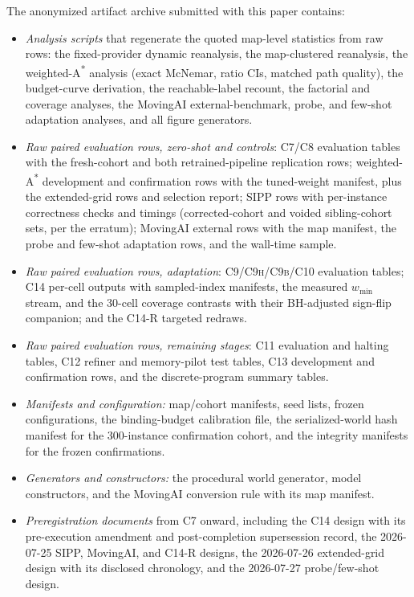 \documentclass[letterpaper]{article} %
\newcommand{\stage}[1]{\textsc{#1}}
\begin{document}
The anonymized artifact archive submitted with this paper contains:
\begin{itemize}
    \item \emph{Analysis scripts} that regenerate the quoted map-level statistics from raw rows: the fixed-provider dynamic reanalysis, the map-clustered reanalysis, the weighted-A\textsuperscript{*} analysis (exact McNemar, ratio CIs, matched path quality), the budget-curve derivation, the reachable-label recount, the factorial and coverage analyses, the MovingAI external-benchmark, probe, and few-shot adaptation analyses, and all figure generators.
    \item \emph{Raw paired evaluation rows, zero-shot and controls}: \stage{C7}/\stage{C8} evaluation tables with the fresh-cohort and both retrained-pipeline replication rows; weighted-A\textsuperscript{*} development and confirmation rows with the tuned-weight manifest, plus the extended-grid rows and selection report; SIPP rows with per-instance correctness checks and timings (corrected-cohort and voided sibling-cohort sets, per the erratum); MovingAI external rows with the map manifest, the probe and few-shot adaptation rows, and the wall-time sample.
    \item \emph{Raw paired evaluation rows, adaptation}: \stage{C9}/\stage{C9h}/\stage{C9b}/\stage{C10} evaluation tables; \stage{C14} per-cell outputs with sampled-index manifests, the measured $w_{\min}$ stream, and the 30-cell coverage contrasts with their BH-adjusted sign-flip companion; and the \stage{C14-R} targeted redraws.
    \item \emph{Raw paired evaluation rows, remaining stages}: \stage{C11} evaluation and halting tables, \stage{C12} refiner and memory-pilot test tables, \stage{C13} development and confirmation rows, and the discrete-program summary tables.
    \item \emph{Manifests and configuration:} map/cohort manifests, seed lists, frozen configurations, the binding-budget calibration file, the serialized-world hash manifest for the 300-instance confirmation cohort, and the integrity manifests for the frozen confirmations.
    \item \emph{Generators and constructors:} the procedural world generator, model constructors, and the MovingAI conversion rule with its map manifest.
    \item \emph{Preregistration documents} from \stage{C7} onward, including the \stage{C14} design with its pre-execution amendment and post-completion supersession record, the 2026-07-25 SIPP, MovingAI, and \stage{C14-R} designs, the 2026-07-26 extended-grid design with its disclosed chronology, and the 2026-07-27 probe/few-shot design.

\end{itemize}
\end{document}
